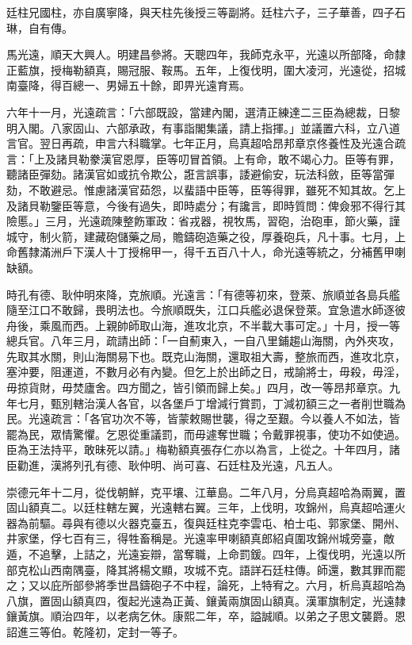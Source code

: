 \begin{pinyinscope}
廷柱兄國柱，亦自廣寧降，與天柱先後授三等副將。廷柱六子，三子華善，四子石琳，自有傳。

馬光遠，順天大興人。明建昌參將。天聰四年，我師克永平，光遠以所部降，命隸正藍旗，授梅勒額真，賜冠服、鞍馬。五年，上復伐明，圍大凌河，光遠從，招城南臺降，得百總一、男婦五十餘，即畀光遠育焉。

六年十一月，光遠疏言：「六部既設，當建內閣，選清正練達二三臣為總裁，日黎明入閣。八家固山、六部承政，有事詣閣集議，請上指揮。」並議置六科，立八道言官。翌日再疏，申言六科職掌。七年正月，烏真超哈昂邦章京佟養性及光遠合疏言：「上及諸貝勒豢漢官恩厚，臣等叨冒首領。上有命，敢不竭心力。臣等有罪，聽諸臣彈劾。諸漢官如或抗令欺公，誑言誤事，諉避偷安，玩法科斂，臣等當彈劾，不敢避忌。惟慮諸漢官茹怨，以蜚語中臣等，臣等得罪，雖死不知其故。乞上及諸貝勒鑒臣等意，今後有過失，即時處分；有讒言，即時質問：俾僉邪不得行其險慝。」三月，光遠疏陳整飭軍政：省戎器，視牧馬，習砲，治砲車，節火藥，謹城守，制火箭，建藏砲儲藥之局，贍鑄砲造藥之役，厚養砲兵，凡十事。七月，上命舊隸滿洲戶下漢人十丁授棉甲一，得千五百八十人，命光遠等統之，分補舊甲喇缺額。

時孔有德、耿仲明來降，克旅順。光遠言：「有德等初來，登萊、旅順並各島兵艦隨至江口不敢歸，畏明法也。今旅順既失，江口兵艦必退保登萊。宜急遣水師逐彼舟後，乘風而西。上親帥師取山海，進攻北京，不半載大事可定。」十月，授一等總兵官。八年三月，疏請出師：「一自薊東入，一自八里鋪趨山海關，內外夾攻，先取其水關，則山海關易下也。既克山海關，還取祖大壽，整旅而西，進攻北京，塞沖要，阻運道，不數月必有內變。但乞上於出師之日，戒諭將士，毋殺，毋淫，毋掠貨財，毋焚廬舍。四方聞之，皆引領而歸上矣。」四月，改一等昂邦章京。九年七月，甄別轄治漢人各官，以各堡戶丁增減行賞罰，丁減初額三之一者削世職為民。光遠疏言：「各官功次不等，皆蒙敕賜世襲，得之至艱。今以養人不如法，皆罷為民，眾情驚懼。乞恩從重議罰，而毋遽奪世職；令戴罪視事，使功不如使過。臣為王法持平，敢昧死以請。」梅勒額真張存仁亦以為言，上從之。十年四月，諸臣勸進，漢將列孔有德、耿仲明、尚可喜、石廷柱及光遠，凡五人。

崇德元年十二月，從伐朝鮮，克平壤、江華島。二年八月，分烏真超哈為兩翼，置固山額真二。以廷柱轄左翼，光遠轄右翼。三年，上伐明，攻錦州，烏真超哈運火器為前驅。尋與有德以火器克臺五，復與廷柱克李雲屯、柏士屯、郭家堡、開州、井家堡，俘七百有三，得牲畜稱是。光遠率甲喇額真郎紹貞圍攻錦州城旁臺，敵遁，不追擊，上詰之，光遠妄辯，當奪職，上命罰鍰。四年，上復伐明，光遠以所部克松山西南隅臺，降其將楊文顯，攻城不克。語詳石廷柱傳。師還，數其罪而罷之；又以庇所部參將季世昌鑄砲子不中程，論死，上特宥之。六月，析烏真超哈為八旗，置固山額真四，復起光遠為正黃、鑲黃兩旗固山額真。漢軍旗制定，光遠隸鑲黃旗。順治四年，以老病乞休。康熙二年，卒，謚誠順。以弟之子思文襲爵。恩詔進三等伯。乾隆初，定封一等子。


\end{pinyinscope}
